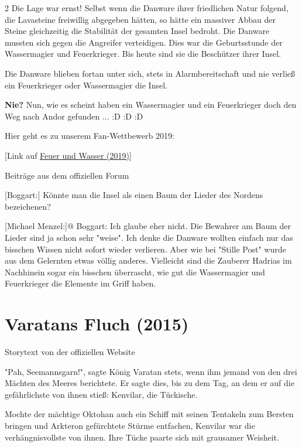 \documentclass[10pt, a4paper, oneside]{book}
\newcommand{\storytext}[2][]{%
        \section{#2}%
        \label{storytext-#1}%
    }
\newcommand{\fillbreak}{\vspace*{\fill}\columnbreak}
\begin{document}
\begin{multicols}{2}
Die Lage war ernst! Selbst wenn die Danware ihrer friedlichen Natur folgend, die Lavasteine freiwillig abgegeben hätten, so hätte ein massiver Abbau der Steine gleichzeitig die Stabilität der gesamten Insel bedroht. Die Danware mussten sich gegen die Angreifer verteidigen. Dies war die Geburtsstunde der Wassermagier und Feuerkrieger. Bis heute sind sie die Beschützer ihrer Insel.\bigskip

Die Danware blieben fortan unter sich, stets in Alarmbereitschaft und nie verließ ein Feuerkrieger oder Wassermagier die Insel.\bigskip

\textbf{Nie?} Nun, wie es scheint haben ein Wassermagier und ein Feuerkrieger doch den Weg nach Andor gefunden ... :D :D :D\bigskip

Hier geht es zu unserem Fan-Wettbewerb 2019: 

[Link auf \hyperref[produkt-2019-feuer-und-wasser]{Feuer und Wasser (2019)}]\bigskip

\begin{center}
    Beiträge aus dem offiziellen Forum
\end{center}

[Boggart:] Könnte man die Insel als einen Baum der Lieder des Nordens bezeichenen?

[Michael Menzel:]@ Boggart: Ich glaube eher nicht. Die Bewahrer am Baum der Lieder sind ja schon sehr "weise". Ich denke die Danware wollten einfach nur das bisschen Wissen nicht sofort wieder verlieren. Aber wie bei "Stille Post" wurde aus dem Gelernten etwas völlig anderes. Vielleicht sind die Zauberer Hadrias im Nachhinein sogar ein bisschen überrascht, wie gut die Wassermagier und Feuerkrieger die Elemente im Griff haben.




\fillbreak
\storytext[2015-varatans-fluch]{Varatans Fluch (2015)}

\begin{center}
    Storytext von der offiziellen Website
\end{center}

"Pah, Seemannsgarn!", sagte König Varatan stets, wenn ihm jemand von den drei Mächten des Meeres berichtete. Er sagte dies, bis zu dem Tag, an dem er auf die gefährlichste von ihnen stieß: Kenvilar, die Tückische.

Mochte der mächtige Oktohan auch ein Schiff mit seinen Tentakeln zum Bersten bringen und Arkteron gefürchtete Stürme entfachen, Kenvilar war die verhängnisvollste  von ihnen. Ihre Tücke paarte sich mit grausamer Weisheit.\bigskip


\end{multicols}
\end{document}
